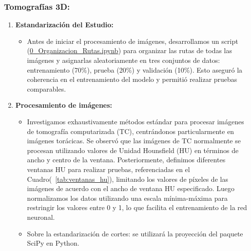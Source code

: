 \documentclass[10pt, oneside, a4paper]{article}
\begin{document}
	\subsubsection{Tomografías 3D:} \label{metodologia_3D}
	
	\begin{enumerate}
		\item \textbf{Estandarización del Estudio:} 
		\begin{itemize}
			\item Antes de iniciar el procesamiento de imágenes, desarrollamos un script (\href{https://github.com/juanfierro94/ct-scan-modeling-thesis-bayesian-deterministic/tree/main/notebooks}{0\_Organizacion\_Rutas.ipynb}) para organizar las rutas de todas las imágenes y asignarlas aleatoriamente en tres conjuntos de datos: entrenamiento (70\%), prueba (20\%) y validación (10\%). Esto aseguró la coherencia en el entrenamiento del modelo y permitió realizar pruebas comparables.
		\end{itemize}
		
		\item \textbf{Procesamiento de imágenes:}
		\begin{itemize}
			\item Investigamos exhaustivamente métodos estándar para procesar imágenes de tomografía computarizada (TC), centrándonos particularmente en imágenes torácicas. Se observó que las imágenes de TC normalmente se procesan utilizando valores de Unidad Hounsfield (HU) en términos de ancho y centro de la ventana. Posteriormente, definimos diferentes ventanas HU para realizar pruebas, referenciadas en el Cuadro(~\ref{tab:ventanas_hu}), limitando los valores de píxeles de las imágenes de acuerdo con el ancho de ventana HU especificado. Luego normalizamos los datos utilizando una escala mínima-máxima para restringir los valores entre 0 y 1, lo que facilita el entrenamiento de la red neuronal.
			\item Sobre la estandarización de cortes: se utilizará la proyección del paquete SciPy \cite{2020SciPy-NMeth} en Python.
	


\end{itemize}
\end{enumerate}
\end{document}
